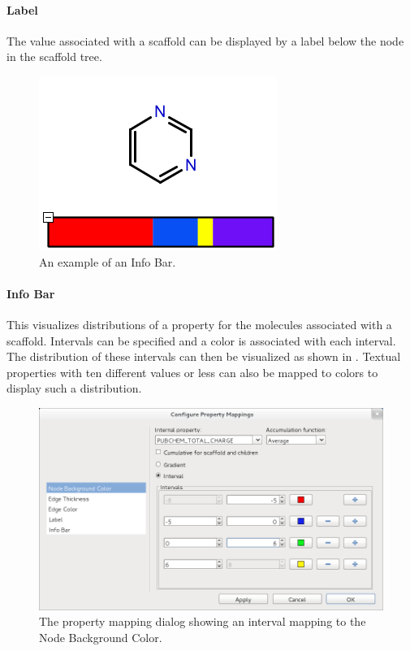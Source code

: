 \paragraph{Label} The value associated with a scaffold can be displayed by a
label below the node in the scaffold tree. 

\begin{figure}[h]
\centering
\includegraphics[scale=0.5]{images/stree/infobar.png}
\caption{An example of an Info Bar.}
\label{fig:treeview:infobar}
\end{figure}

\paragraph{Info Bar} This visualizes distributions of a property for the
molecules associated with a scaffold. Intervals can be specified and a
color is associated with each interval. The distribution of these intervals can then
be visualized as shown in . Textual properties
with ten different values or less can also be mapped to colors to display such a
distribution.

\begin{figure}[p]
\centering
\includegraphics[scale=0.5]{images/stree/mappingdialog.png}
\caption{The property mapping dialog showing an interval mapping to the Node
Background Color.}
\label{fig:treeview:propmapdialog}
\end{figure}

